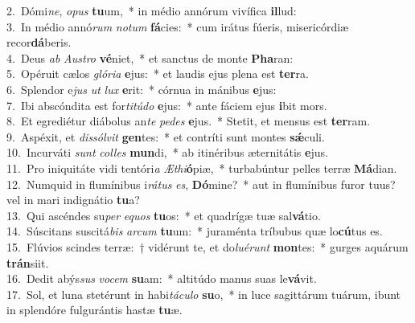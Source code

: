 {2.~}Dómi\textit{ne}, \textit{o}\textit{pus} \textbf{tu}um,~* in médio annórum vivífica \textbf{il}lud:\\
{3.~}In médio annó\textit{rum} \textit{no}\textit{tum} \textbf{fá}cies:~* cum irátus fúeris, misericórdiæ recor\textbf{dá}beris.\\
{4.~}Deus \textit{ab} \textit{Au}\textit{stro} \textbf{vé}niet,~* et sanctus de monte \textbf{Pha}ran:\\
{5.~}Opéruit cælos \textit{gló}\textit{ri}\textit{a} \textbf{e}jus:~* et laudis ejus plena est \textbf{ter}ra.\\
{6.~}Splendor e\textit{jus} \textit{ut} \textit{lux} \textbf{e}rit:~* córnua in mánibus \textbf{e}jus:\\
{7.~}Ibi abscóndita est for\textit{ti}\textit{tú}\textit{do} \textbf{e}jus:~* ante fáciem ejus \textbf{i}bit mors.\\
{8.~}Et egrediétur diábolus an\textit{te} \textit{pe}\textit{des} \textbf{e}jus.~* Stetit, et mensus est \textbf{ter}ram.\\
{9.~}Aspéxit, et \textit{dis}\textit{sól}\textit{vit} \textbf{gen}tes:~* et contríti sunt montes \textbf{sǽ}culi.\\
{10.~}Incurváti \textit{sunt} \textit{col}\textit{les} \textbf{mun}di,~* ab itinéribus æternitátis \textbf{e}jus.\\
{11.~}Pro iniquitáte vidi tentóri\textit{a} \textit{Æ}\textit{thi}\textbf{ó}piæ,~* turbabúntur pelles terræ \textbf{Má}dian.\\
{12.~}Numquid in flumínibus i\textit{rá}\textit{tus} \textit{es}, \textbf{Dó}mine?~* aut in flumínibus furor tuus? vel in mari indignátio \textbf{tu}a?\\
{13.~}Qui ascéndes su\textit{per} \textit{e}\textit{quos} \textbf{tu}os:~* et quadrígæ tuæ sal\textbf{vá}tio.\\
{14.~}Súscitans suscitá\textit{bis} \textit{ar}\textit{cum} \textbf{tu}um:~* juraménta tríbubus quæ lo\textbf{cú}tus es.\\
{15.~}Flúvios scindes terræ:~† vidérunt te, et do\textit{lu}\textit{é}\textit{runt} \textbf{mon}tes:~* gurges aquárum \textbf{trán}siit.\\
{16.~}Dedit abýs\textit{sus} \textit{vo}\textit{cem} \textbf{su}am:~* altitúdo manus suas le\textbf{vá}vit.\\
{17.~}Sol, et luna stetérunt in habi\textit{tá}\textit{cu}\textit{lo} \textbf{su}o,~* in luce sagittárum tuárum, ibunt in splendóre fulgurántis hastæ \textbf{tu}æ.\\
